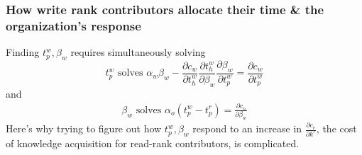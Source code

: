 \documentclass[source/paper/main.tex]{subfiles}
\begin{document}
\subsubsection{How write rank contributors allocate their time \& the organization's response}
Finding $t_p^w, \beta_w$ requires simultaneously solving 
$$t_p^w \text{ solves } \alpha_w \beta_w - \frac{\partial c_w}{\partial t_h^w} \frac{\partial t_h^w}{\partial \beta_w}\frac{\partial \beta_w}{\partial t_p^w} = \frac{\partial c_w}{\partial t_p^w} $$
and
\begin{align}
    \beta_w \text{ solves } \alpha_o(t_p^w - t_p^r) = \frac{\partial c_o}{\partial \beta_w} \label{org_solution}
\end{align}
Here's why trying to figure out how $t_p^w, \beta_w$ respond to an increase in $\frac{\partial c_r}{\partial k^r}$, the cost of knowledge acquisition for read-rank contributors, is complicated. 
\end{document}
